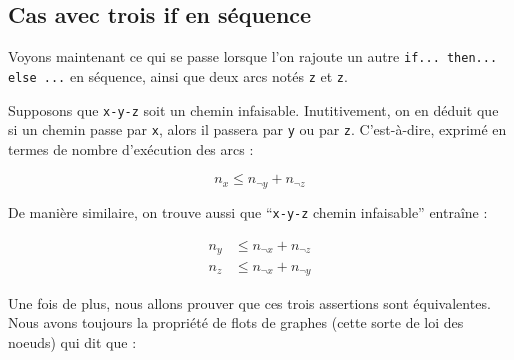 \documentclass[french]{article}
\begin{document}
  \subsection{Cas avec trois if en séquence}

  \begin{minipage}[c]{.45\linewidth}
  Voyons maintenant ce qui se passe lorsque l'on rajoute un autre \texttt{if... then... else ...} en séquence, ainsi que deux arcs notés \texttt{z} et \texttt{\textlnot z}.

  Supposons que \texttt{x-y-z} soit un chemin infaisable. Inutitivement, on en déduit que si un chemin passe par \texttt{x}, alors il passera par \texttt{\textlnot y} ou par \texttt{\textlnot z}. C'est-à-dire, exprimé en termes de nombre d'exécution des arcs :

  \[n_x \leq n_{\neg y} + n_{\neg z} \]

  De manière similaire, on trouve aussi que ``\texttt{x-y-z} chemin infaisable'' entraîne :

  \begin{align*}
    n_y &\leq n_{\neg x} + n_{\neg z} \\
    n_z &\leq n_{\neg x} + n_{\neg y}
  \end{align*}

  Une fois de plus, nous allons prouver que ces trois assertions sont équivalentes. Nous avons toujours la propriété de flots de graphes (cette sorte de loi des noeuds) qui dit que :
  \end{minipage}
  \hfill
\end{document}
